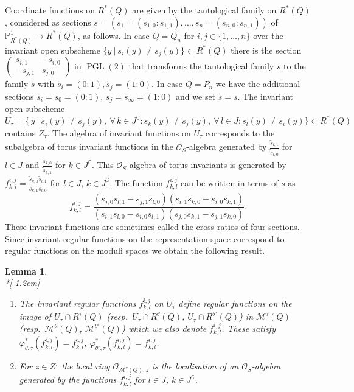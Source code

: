 \documentclass[10pt,a4paper]{amsart}
\newtheorem{lemma}[theo]{Lemma}
\theoremstyle{definition}
\def\phi{\varphi}
\def\P{\mathds P}
\def\O{\mathcal O}
\DeclareMathOperator{\PGL}{PGL}
\begin{document}
Coordinate functions on $R^*(Q)$ are given by the tautological family on $R^*(Q)$, 
considered as sections 
$s=(s_1\!=\!(s_{1,0}\!:\!s_{1,1}),\ldots,s_n\!=\!(s_{n,0}\!:\!s_{n,1}))$ 
of $\P^1_{R^*(Q)}\to R^*(Q)$, as follows. 
In case $Q=Q_n$ for $i,j\in\{1,\ldots,n\}$ over the invariant open subscheme 
$\{y\:|\:s_i(y)\neq s_j(y)\}\subset R^*(Q)$ there is the section
$\left(\begin{smallmatrix} s_{i,1}&-s_{i,0}\\ -s_{j,1}&s_{j,0}\end{smallmatrix}\right)$
in $\PGL(2)$ that transforms the tautological family $s$ to the family $\tilde{s}$ 
with $\tilde{s}_i=(0:1),\tilde{s}_j=(1:0)$.
In case $Q=P_n$ we have the additional sections $s_i=s_0=(0:1)$, $s_j=s_\infty=(1:0)$ 
and we set $\tilde{s}=s$.
The invariant open subscheme 
\[
U_\tau=\big\{\,y\:\big|\:s_i(y)\neq s_j(y),\:
\forall\,k\!\in\!J^\complement\colon s_k(y)\neq s_j(y),\:
\forall\,l\!\in\!J\colon s_l(y)\neq s_i(y)\big\}\subset R^*(Q)
\]
contains $Z_\tau$. The algebra of invariant functions on $U_\tau$ corresponds to 
the subalgebra of torus invariant functions in the $\O_S$-algebra generated by 
$\frac{\tilde{s}_{l,1}}{\tilde{s}_{l,0}}$ for $l\in J$ and
$\frac{\tilde{s}_{k,0}}{\tilde{s}_{k,1}}$ for $k\in J^\complement$. 
This $\O_S$-algebra of torus invariants is generated by 
$f^{i,j}_{k,l}=\frac{\tilde{s}_{k,0}\tilde{s}_{l,1}}{\tilde{s}_{k,1}\tilde{s}_{l,0}}$
for $l\in J$, $k\in J^\complement$.
The function $f^{i,j}_{k,l}$ can be written in terms of $s$ as
\[
f^{i,j}_{k,l}=\frac{(s_{j,0}s_{l,1}-s_{j,1}s_{l,0})(s_{i,1}s_{k,0}-s_{i,0}s_{k,1})}
{(s_{i,1}s_{l,0}-s_{i,0}s_{l,1})(s_{j,0}s_{k,1}-s_{j,1}s_{k,0})}.
\]
These invariant functions are sometimes called the cross-ratios of four sections.
Since invariant regular functions on the representation space correspond to regular 
functions on the moduli spaces we obtain the following result.

\begin{lemma}\ \\*[-1.2em]\label{le:fijlk}

\begin{enumerate}[label=(\alph*)]
\item\label{lemma2.13_a}
The invariant regular functions $f^{i,j}_{k,l}$ on $U_\tau$ define 
regular functions on the image of $U_\tau\cap R^\tau(Q)$ (resp.\ $U_\tau\cap R^\theta(Q)$,
$U_\tau\cap R^{\theta'}(Q)$) in $\mathcal M^\tau(Q)$ (resp.\ $\mathcal M^\theta(Q)$, 
$\mathcal M^{\theta'}(Q)$) which we also denote $f^{i,j}_{k,l}$.
These satisfy $\phi_{\theta,\tau}^*(f^{i,j}_{k,l})=f^{i,j}_{k,l}$,
$\phi_{\theta',\tau}^*(f^{i,j}_{k,l})=f^{i,j}_{k,l}$. %

\item\label{lemma2.13_b}
For $z\in Z^\tau$ the local ring $\O_{\mathcal M^\tau(Q),z}$ is the 
localisation of an $\O_S$-algebra generated by the functions $f^{i,j}_{k,l}$ for 
$l\in J$, $k\in J^\complement$.
\end{enumerate}
\end{lemma}
\end{document}
